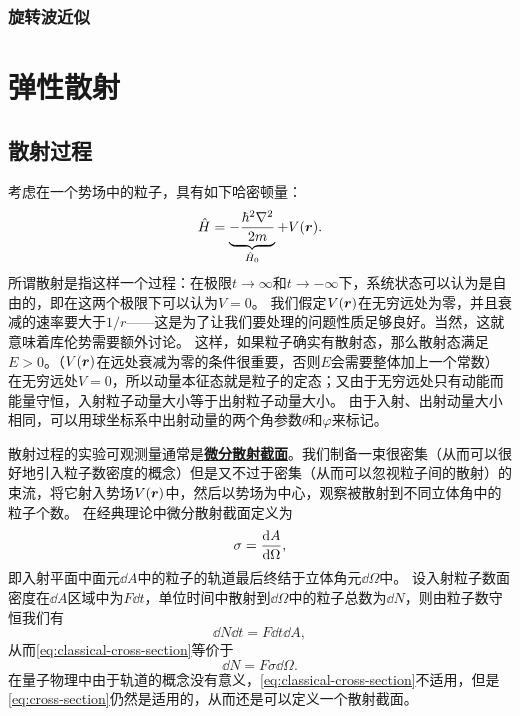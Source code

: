 \documentclass[UTF8, a4paper]{ctexart}
\newcommand{\concept}[1]{\underline{\textbf{#1}}}
\begin{document}
\subsubsection{旋转波近似}



\section{弹性散射}

\subsection{散射过程}

考虑在一个势场中的粒子，具有如下哈密顿量：
\begin{equation}
    \hat{H} = \underbrace{- \frac{\hbar^2 \laplacian}{2m}}_{\hat{H}_0} + V(\vb*{r}).
\end{equation}
所谓散射是指这样一个过程：在极限$t\to \infty$和$t \to -\infty$下，系统状态可以认为是自由的，即在这两个极限下可以认为$V=0$。
我们假定$V(\vb*{r})$在无穷远处为零，并且衰减的速率要大于$1/r$——这是为了让我们要处理的问题性质足够良好。当然，这就意味着库伦势需要额外讨论。
这样，如果粒子确实有散射态，那么散射态满足$E > 0$。（$V(\vb*{r})$在远处衰减为零的条件很重要，否则$E$会需要整体加上一个常数）
在无穷远处$V=0$，所以动量本征态就是粒子的定态；又由于无穷远处只有动能而能量守恒，入射粒子动量大小等于出射粒子动量大小。
由于入射、出射动量大小相同，可以用球坐标系中出射动量的两个角参数$\theta$和$\varphi$来标记。

散射过程的实验可观测量通常是\concept{微分散射截面}。我们制备一束很密集（从而可以很好地引入粒子数密度的概念）但是又不过于密集（从而可以忽视粒子间的散射）的束流，将它射入势场$V(\vb*{r})$中，然后以势场为中心，观察被散射到不同立体角中的粒子个数。
在经典理论中微分散射截面定义为
\begin{equation}
    \sigma = \dv{A}{\Omega},
    \label{eq:classical-cross-section}
\end{equation}
即入射平面中面元$\dd{A}$中的粒子的轨道最后终结于立体角元$\dd{\Omega}$中。
设入射粒子数面密度在$\dd{A}$区域中为$F \dd{t}$，单位时间中散射到$\dd{\Omega}$中的粒子总数为$\dd{N}$，则由粒子数守恒我们有
\[
    \dd{N} \dd{t} = F \dd{t} \dd{A},
\]
从而\eqref{eq:classical-cross-section}等价于
\begin{equation}
    \dd{N} = F \sigma \dd{\Omega}.
    \label{eq:cross-section}
\end{equation}
在量子物理中由于轨道的概念没有意义，\eqref{eq:classical-cross-section}不适用，但是\eqref{eq:cross-section}仍然是适用的，从而还是可以定义一个散射截面。
\end{document}
